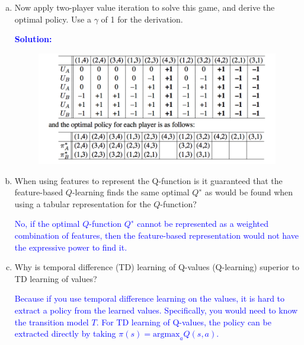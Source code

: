 \documentclass[a4paper]{article}
\begin{document}
\begin{enumerate}[(a)]
\item Now apply two-player value iteration to solve this game, and derive the optimal policy. Use a $\gamma$ of 1 for the derivation.


\textcolor{blue}{\textbf{Solution:}}
\begin{center}
\begin{figure}[h!]
\centering
\includegraphics[width=.8\textwidth]{figs/value-it}
\end{figure}
\end{center}

\item When using features to represent the Q-function is it guaranteed that the feature-based $Q$-learning finds the same optimal $Q^∗$ as would be found when using a tabular representation for the $Q$-function?

\textcolor{blue}{No, if the optimal $Q$-function $Q^∗$ cannot be represented as a weighted combination of features, then the feature-based representation would not have the expressive power to find it.}

\item Why is temporal difference (TD) learning of Q-values (Q-learning) superior to TD learning of values?

\textcolor{blue}{Because if you use temporal difference learning on the values, it is hard to extract a policy from the learned values. Specifically, you would need to know the transition model $T$. For TD learning of Q-values, the policy can be extracted directly by taking $\pi(s) = \text{argmax}_a Q(s, a)$.}

\end{enumerate}

\newpage
\end{document}
